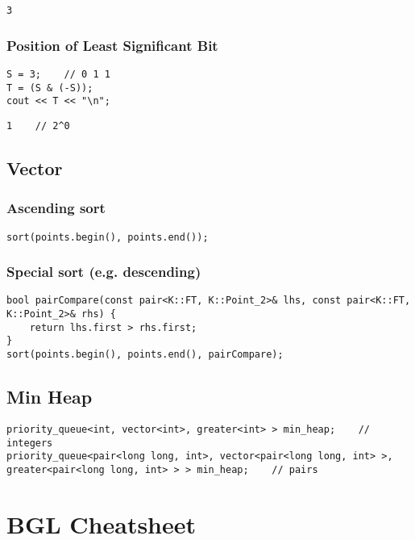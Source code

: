 \documentclass[11pt]{article}
\let\stdsection\section
\renewcommand\section{\newpage\stdsection}
\begin{document}
\begin{lstlisting}
3
\end{lstlisting}

\subsubsection{Position of Least Significant Bit}
\begin{lstlisting}
S = 3;    // 0 1 1
T = (S & (-S));
cout << T << "\n";
\end{lstlisting}

\begin{lstlisting}
1    // 2^0
\end{lstlisting}

\subsection{Vector}
\subsubsection{Ascending sort}
\begin{lstlisting}
sort(points.begin(), points.end());
\end{lstlisting}

\subsubsection{Special sort (e.g. descending)}
\begin{lstlisting}
bool pairCompare(const pair<K::FT, K::Point_2>& lhs, const pair<K::FT, K::Point_2>& rhs) {
    return lhs.first > rhs.first;
}
sort(points.begin(), points.end(), pairCompare);
\end{lstlisting}

\subsection{Min Heap}
\begin{lstlisting}
priority_queue<int, vector<int>, greater<int> > min_heap;    // integers
priority_queue<pair<long long, int>, vector<pair<long long, int> >, greater<pair<long long, int> > > min_heap;    // pairs
\end{lstlisting}


\section{BGL Cheatsheet}
\end{document}
